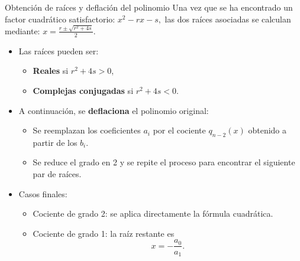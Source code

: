 \documentclass[../../main.tex]{subfiles}
\begin{document}
\begin{frame}{Obtención de raíces y deflación del polinomio}
  Una vez que se ha encontrado un factor cuadrático satisfactorio:  \(
    x^2 - r x - s,
  \)
  las dos raíces asociadas se calculan mediante:
  \(
    x = \frac{r \pm \sqrt{r^2 + 4s}}{2}.
  \)

  \begin{itemize}
    \item Las raíces pueden ser:
      \begin{itemize}
        \item \textbf{Reales} si \(r^2 + 4s > 0\),
        \item \textbf{Complejas conjugadas} si \(r^2 + 4s < 0\).
      \end{itemize}
    \item A continuación, se \textbf{deflaciona} el polinomio original:
      \begin{itemize}
        \item Se reemplazan los coeficientes \(a_i\) por el cociente \(q_{n-2}(x)\)
              obtenido a partir de los \(b_i\).
        \item Se reduce el grado en 2 y se repite el proceso para encontrar
              el siguiente par de raíces.
      \end{itemize}
    \item Casos finales:
      \begin{itemize}
        \item Cociente de grado 2: se aplica directamente la fórmula cuadrática.
        \item Cociente de grado 1: la raíz restante es
          \[
            x = -\frac{a_0}{a_1}.
          \]
      \end{itemize}
  \end{itemize}
\end{frame}
\end{document}
